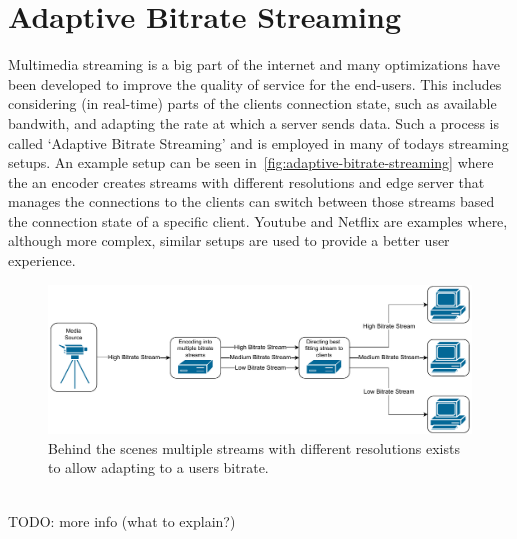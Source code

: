 \section{Adaptive Bitrate Streaming}\label{sec:adaptive_bitrate_streaming}
Multimedia streaming is a big part of the internet and many optimizations have
been developed to improve the quality of service for the end-users.
This includes considering (in real-time) parts of the clients connection state, 
such as available bandwith, and adapting the rate at which a server sends data.
Such a process is called `Adaptive Bitrate Streaming' and is employed in many 
of todays streaming setups.
An example setup can be seen in~\autoref{fig:adaptive-bitrate-streaming} where
the an encoder creates streams with different resolutions and edge server that 
manages the connections to the clients can switch between those streams based 
the connection state of a specific client.
Youtube and Netflix are examples where, although more complex, similar setups
are used to provide a better user experience. 
\begin{figure}[htbp]
    \centering
    \includegraphics[width=\textwidth]{figures/02_background/adaptive-bitrate-streaming.drawio.pdf}
    \caption[Adaptive streaming schematic]{Behind the scenes multiple streams with different
    resolutions exists to allow adapting to a users bitrate.}\label{fig:adaptive-bitrate-streaming}
\end{figure}
\vspace{1cm}
\\
TODO: more info (what to explain?)